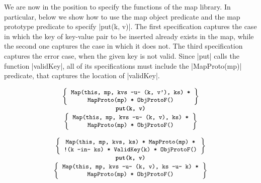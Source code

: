 We are now in the position to specify the functions of the map library. In particular, below we show how to use 
the map object predicate and the map prototype predicate to specify \jsinline|put(k, v)|.  
%
The first specification captures the case in which the key of key-value pair to be inserted 
already exists in the map, while the second one captures the case in which it does not. 
The third specification captures the error case, when the given key is not valid.
Since \jsinline|put| calls the function \jsinline|validKey|, all of its specifications must include the \jsinline|MapProto(mp)| predicate, that captures the location of \jsinline|validKey|. 

\noindent

\begin{displaymath} 
{\footnotesize
\begin{array}{c}
\left\{ {\begin{array}{c}
 \text{\texttt{Map(this, mp, kvs -u- (k, v'), ks) *}} \\ 
 \text{\texttt{MapProto(mp) * ObjProtoF()}} 
\end{array}} \right\} \\
%
\text{\bfseries \texttt{put(k, v)}} \\[0.2mm]
%
\left\{ {\begin{array}{c}
 \text{\texttt{Map(this, mp, kvs -u- (k, v), ks) *}} \\
 \text{\texttt{MapProto(mp) * ObjProtoF()}} 
\end{array}} \right\}
\end{array}
} 
\end{displaymath}


\begin{displaymath} 
{\footnotesize
\begin{array}{c}
\left\{ {\begin{array}{c}
 \text{\texttt{Map(this, mp, kvs, ks) * MapProto(mp) *}} \\
 \text{\texttt{!(k -in- ks) * ValidKey(k) * ObjProtoF()}} 
\end{array}} \right\} \\
%
\text{\bfseries \texttt{put(k, v)}} \\[0.2mm]
%
\left\{ {\begin{array}{c}
 \text{\texttt{Map(this, mp, kvs -u- (k, v), ks -u- k) *}} \\
 \text{\texttt{MapProto(mp) * ObjProtoF()}} 
\end{array}} \right\} \\
\end{array}}
\end{displaymath}

